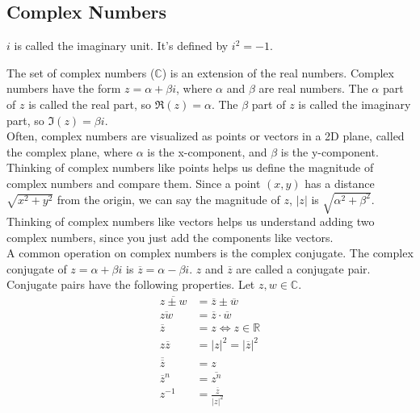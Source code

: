 \subsection{Complex Numbers}
\begin{definition}
	$i$ is called the imaginary unit. It's defined by $i^2 = -1$.
\end{definition}


\noindent
The set of complex numbers ($\mathbb{C}$) is an extension of the real numbers. Complex numbers have the form $z = \alpha + \beta i$, where $\alpha$ and $\beta$ are real numbers. The $\alpha$ part of $z$ is called the real part, so $\Re(z) = \alpha$. The $\beta$ part of $z$ is called the imaginary part, so $\Im(z) = \beta i$.\\

\noindent
Often, complex numbers are visualized as points or vectors in a 2D plane, called the complex plane, where $\alpha$ is the x-component, and $\beta$ is the y-component. Thinking of complex numbers like points helps us define the magnitude of complex numbers and compare them. Since a point $(x,y)$ has a distance $\sqrt{x^2+y^2}$ from the origin, we can say the magnitude of $z$, $\lvert z \rvert$ is $\sqrt{\alpha^2 + \beta^2}$. Thinking of complex numbers like vectors helps us understand adding two complex numbers, since you just add the components like vectors.\\

\noindent
A common operation on complex numbers is the complex conjugate. The complex conjugate of $z = \alpha + \beta i$ is $\overline{z} = \alpha - \beta i$. $z$ and $\overline{z}$ are called a conjugate pair.\\

\noindent
Conjugate pairs have the following properties.
Let $z, w \in \mathbb{C}$.
\begin{align*}
	\overline{z \pm w} &= \overline{z} \pm \overline{w} \\
	\overline{zw} &= \overline{z}\cdot\overline{w} \\
	\overline{z} &= z \Leftrightarrow z \in \mathbb{R} \\
	z\overline{z} &= \lvert z \rvert^2 = \lvert \overline{z} \rvert^2 \\
	\overline{\overline{z}} &= z \\
	\overline{z}^n &= \overline{z^n} \\
	z^{-1} &= \frac{\overline{z}}{\lvert z \rvert^2} 
\end{align*}
